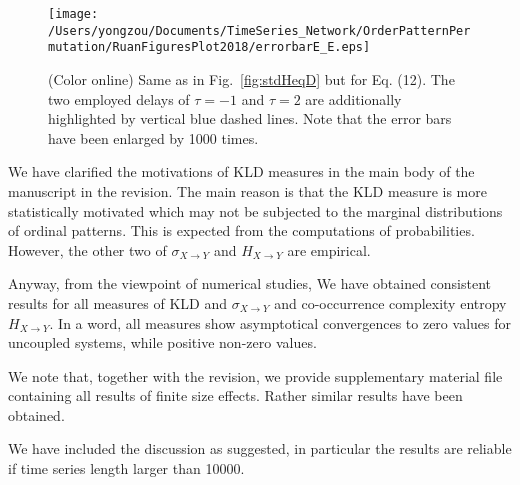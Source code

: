 \documentclass[aps,chaos,superscriptaddress,showkeys]{revtex4}
\begin{document}
\begin{figure}
	\centering
	\texttt{[image: /Users/yongzou/Documents/TimeSeries\_Network/OrderPatternPermutation/RuanFiguresPlot2018/errorbarE\_E.eps]}
\caption{(Color online) Same as in Fig.~\ref{fig:stdHeqD} but for Eq. (12). The two employed delays of $\tau = -1$ and $\tau = 2$ are additionally highlighted by vertical blue dashed lines. {\color{red}Note that the error bars have been enlarged by 1000 times.}\label{fig:stdHeqE}}
\end{figure}




\begin{center}
\begin{minipage}[c]{0.9\textwidth}
We have clarified the motivations of KLD measures in the main body of the manuscript in the revision. The main reason is that the KLD measure is more statistically motivated which may not be subjected to the marginal distributions of ordinal patterns. This is expected from the computations of probabilities. However, the other two of $\sigma_{X\to Y}$ and $H_{X\to Y}$ are empirical. 
\vspace{0.6cm}

Anyway, from the viewpoint of numerical studies, We have obtained consistent results for all measures of KLD and $\sigma_{X\to Y}$ and co-occurrence complexity entropy $H_{X\to Y}$. In a word, all measures show asymptotical convergences to zero values for uncoupled systems, while positive non-zero values. 
\vspace{0.6cm}

We note that, together with the revision, we provide supplementary material file containing all results of finite size effects. Rather similar results have been obtained. 
\vspace{0.6cm}

We have included the discussion as suggested, in particular the results are reliable if time series length larger than 10000. 
\end{minipage}
\end{center}
\end{document}
